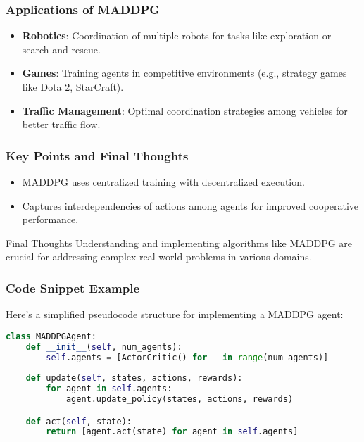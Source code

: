 \documentclass[aspectratio=169]{beamer}
\begin{document}
\begin{frame}[fragile]
    \frametitle{Applications of MADDPG}
    
    \begin{itemize}
        \item \textbf{Robotics}: Coordination of multiple robots for tasks like exploration or search and rescue.
        \item \textbf{Games}: Training agents in competitive environments (e.g., strategy games like Dota 2, StarCraft).
        \item \textbf{Traffic Management}: Optimal coordination strategies among vehicles for better traffic flow.
    \end{itemize}
\end{frame}

\begin{frame}[fragile]
    \frametitle{Key Points and Final Thoughts}
    
    \begin{itemize}
        \item MADDPG uses centralized training with decentralized execution.
        \item Captures interdependencies of actions among agents for improved cooperative performance.
    \end{itemize}

    \begin{block}{Final Thoughts}
        Understanding and implementing algorithms like MADDPG are crucial for addressing complex real-world problems in various domains.
    \end{block}
\end{frame}

\begin{frame}[fragile]
    \frametitle{Code Snippet Example}
    
    Here’s a simplified pseudocode structure for implementing a MADDPG agent:
    
    \begin{lstlisting}[language=Python]
class MADDPGAgent:
    def __init__(self, num_agents):
        self.agents = [ActorCritic() for _ in range(num_agents)]
        
    def update(self, states, actions, rewards):
        for agent in self.agents:
            agent.update_policy(states, actions, rewards)

    def act(self, state):
        return [agent.act(state) for agent in self.agents]
    \end{lstlisting}
\end{frame}
\end{document}
